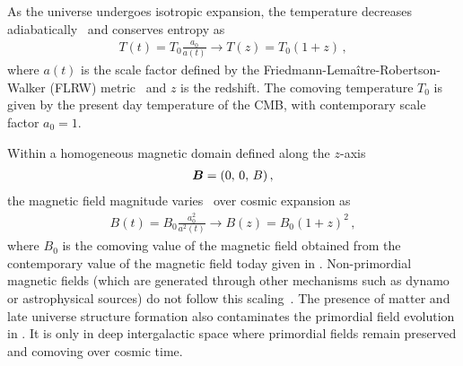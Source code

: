 As the universe undergoes isotropic expansion, the temperature decreases adiabatically~\citep{Abdalla:2022yfr} and conserves entropy as 
\begin{align}
 \label{tscale}
 T(t)=T_{0}\frac{a_{0}}{a(t)}\rightarrow T(z)=T_{0}(1+z)\,,
\end{align}
where $a(t)$ is the scale factor defined by the Friedmann-Lema{\^i}tre-Robertson-Walker (FLRW) metric~\citep{weinberg1972gravitation} and $z$ is the redshift. The comoving temperature $T_{0}$ is given by the present day temperature of the CMB, with contemporary scale factor $a_{0}=1$.

Within a homogeneous magnetic domain defined along the $z$-axis
\begin{align}
    \label{homoB:1}
    \boldsymbol{B}=(0,\,0,\,B)\,,
\end{align}
the magnetic field magnitude varies~\citep{Durrer:2013pga} over cosmic expansion as
\begin{align}
 \label{bscale}
 B(t)=B_{0}\frac{a_{0}^{2}}{a^{2}(t)}\rightarrow B(z)=B_{0}\left(1+z\right)^{2}\,,
\end{align}
where $B_{0}$ is the comoving value of the magnetic field obtained from the contemporary value of the magnetic field today given in . Non-primordial magnetic fields (which are generated through other mechanisms such as dynamo or astrophysical sources) do not follow this scaling~\citep{Pomakov:2022cem}. The presence of matter and late universe structure formation also contaminates the primordial field evolution in . It is only in deep intergalactic space where primordial fields remain preserved and comoving over cosmic time.

